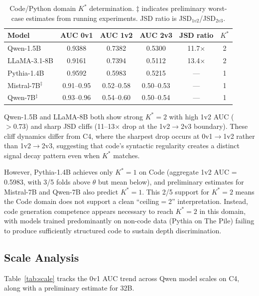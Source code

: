 \documentclass[11pt]{article}
\newcommand{\kstar}{K^*}
\newcommand{\thetaval}{\theta}
\begin{document}
\begin{table}[t]
\centering
\caption{Code/Python domain $\kstar$ determination. $\ddagger$ indicates preliminary worst-case estimates from running experiments. JSD ratio is JSD$_{1v2}$/JSD$_{2v3}$.}
\label{tab:code}
\small
\begin{tabular}{lccccc}
\toprule
Model & AUC 0v1 & AUC 1v2 & AUC 2v3 & JSD ratio & $\kstar$ \\
\midrule
Qwen-1.5B & 0.9388 & 0.7382 & 0.5300 & 11.7$\times$ & 2 \\
LLaMA-3.1-8B & 0.9161 & 0.7394 & 0.5112 & 13.4$\times$ & 2 \\
\midrule
Pythia-1.4B & 0.9592 & 0.5983 & 0.5215 & --- & 1 \\
Mistral-7B$^\ddagger$ & 0.91--0.95 & 0.52--0.58 & 0.50--0.53 & --- & 1 \\
Qwen-7B$^\ddagger$ & 0.93--0.96 & 0.54--0.60 & 0.50--0.54 & --- & 1 \\
\bottomrule
\end{tabular}
\end{table}

Qwen-1.5B and LLaMA-8B both show strong $\kstar{=}2$ with high 1v2 AUC ($>0.73$) and sharp JSD cliffs (11--13$\times$ drop at the 1v2$\to$2v3 boundary). These cliff dynamics differ from C4, where the sharpest drop occurs at 0v1$\to$1v2 rather than 1v2$\to$2v3, suggesting that code's syntactic regularity creates a distinct signal decay pattern even when $\kstar$ matches.

However, Pythia-1.4B achieves only $\kstar{=}1$ on Code (aggregate 1v2 AUC = 0.5983, with 3/5 folds above $\thetaval$ but mean below), and preliminary estimates for Mistral-7B and Qwen-7B also predict $\kstar{=}1$.
This 2/5 support for $\kstar{=}2$ means the Code domain does not support a clean ``ceiling$=$2'' interpretation.
Instead, code generation competence appears necessary to reach $\kstar{=}2$ in this domain, with models trained predominantly on non-code data (Pythia on The Pile) failing to produce sufficiently structured code to sustain depth discrimination.


\subsection{Scale Analysis}
\label{sec:scale}

Table~\ref{tab:scale} tracks the 0v1 AUC trend across Qwen model scales on C4, along with a preliminary estimate for 32B.
\end{document}

